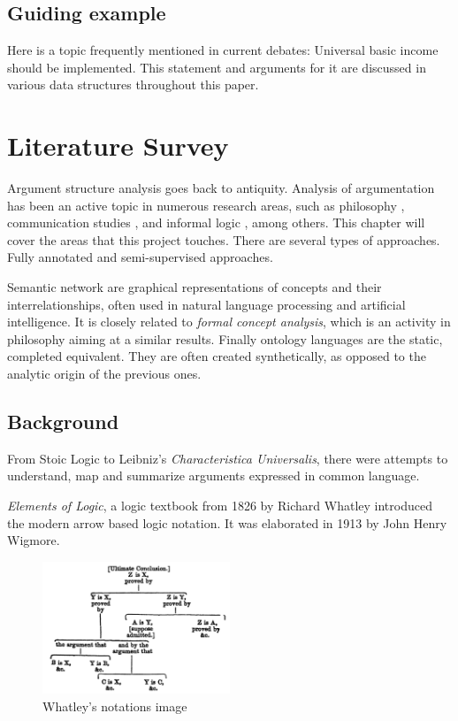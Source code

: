 \documentclass{report}
\begin{document}
\section{Guiding example}

Here is a topic frequently mentioned in current debates: Universal basic income should be implemented.
This statement and arguments for it are discussed in various data structures throughout this paper.

\chapter{Literature Survey}
Argument structure analysis goes back to antiquity. \cite{angelelli_techniques_1970}
Analysis of argumentation has been an active topic in numerous research areas, such as philosophy \cite{van_eemeren_systematic_2003}, communication studies \cite{mercier_why_2011}, and informal logic \cite{blair_informal_2000}, among others. This chapter will cover the areas that this project touches. There are several types of approaches. Fully annotated and semi-supervised approaches.

Semantic network \cite{noauthor_semantic_2023} are graphical representations of concepts and their interrelationships, often used in natural language processing and artificial intelligence. It is closely related to \textit{formal concept analysis}, which is an activity in philosophy aiming at a similar results. Finally ontology languages are the static, completed equivalent. They are often created synthetically, as opposed to the analytic origin of the previous ones.

\section{Background}
From Stoic Logic to Leibniz's \textit{Characteristica Universalis}, there were attempts to understand, map and summarize arguments expressed in common language. 

\cite{woltzenlogel_paleo_leibnizs_2016}
\textit{Elements of Logic}, a logic textbook from 1826 by Richard Whatley introduced the modern arrow based logic notation. It was elaborated in 1913 by John Henry Wigmore.
\cite{wigmore_principles_1913}

\begin{figure}[h]
    \centering
    \includegraphics[width=0.5\textwidth]{./images/Whatley.png}
    \caption{Whatley's notations image}
\end{figure}
\end{document}
